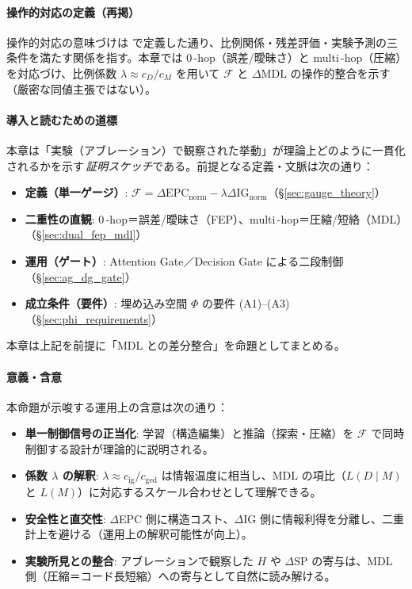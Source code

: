 \documentclass[ja=standard,xelatex]{bxjsarticle}
\newcommand{\F}{\mathcal{F}}
\newcommand{\gednorm}{\Delta\mathrm{EPC}_{\mathrm{norm}}}
\newcommand{\ignorm}{\Delta\mathrm{IG}_{\mathrm{norm}}}
\begin{document}
\paragraph{操作的対応の定義（再掲）}
操作的対応の意味づけは  で定義した通り、比例関係・残差評価・実験予測の三条件を満たす関係を指す。本章では 0\,\mbox{-}hop（誤差/曖昧さ）と multi\,\mbox{-}hop（圧縮）を対応づけ、比例係数 $\lambda\approx c_{\!D}/c_{\!M}$ を用いて $\F$ と $\Delta\mathrm{MDL}$ の操作的整合を示す（厳密な同値主張ではない）。

\paragraph{導入と読むための道標}
本章は「実験（アブレーション）で観察された挙動」が理論上どのように一貫化されるかを示す\,\emph{証明スケッチ}である。前提となる定義・文脈は次の通り：
\begin{itemize}[leftmargin=*]
  \item \textbf{定義（単一ゲージ）}: $\F=\gednorm-\lambda\ignorm$（\S\ref{sec:gauge_theory}）
  \item \textbf{二重性の直観}: 0\,\mbox{-}hop＝誤差/曖昧さ（FEP）、multi\,\mbox{-}hop＝圧縮/短絡（MDL）（\S\ref{sec:dual_fep_mdl}）
  \item \textbf{運用（ゲート）}: Attention Gate／Decision Gate による二段制御（\S\ref{sec:ag_dg_gate}）
  \item \textbf{成立条件（要件）}: 埋め込み空間 $\Phi$ の要件 (A1)--(A3)（\S\ref{sec:phi_requirements}）
\end{itemize}
本章は上記を前提に「MDL との差分整合」を命題としてまとめる。

\paragraph{意義・含意}
本命題が示唆する運用上の含意は次の通り：
\begin{itemize}[leftmargin=*]
  \item \textbf{単一制御信号の正当化}: 学習（構造編集）と推論（探索・圧縮）を $\F$ で同時制御する設計が理論的に説明される。
  \item \textbf{係数 $\lambda$ の解釈}: $\lambda\approx c_{\mathrm{ig}}/c_{\mathrm{ged}}$ は情報温度に相当し、MDL の項比（$L(D\mid M)$ と $L(M)$）に対応するスケール合わせとして理解できる。
  \item \textbf{安全性と直交性}: $\Delta$EPC 側に構造コスト、$\Delta$IG 側に情報利得を分離し、二重計上を避ける（運用上の解釈可能性が向上）。
  \item \textbf{実験所見との整合}: アブレーションで観察した $H$ や $\Delta\mathrm{SP}$ の寄与は、MDL 側（圧縮＝コード長短縮）への寄与として自然に読み解ける。
\end{itemize}
\end{document}
